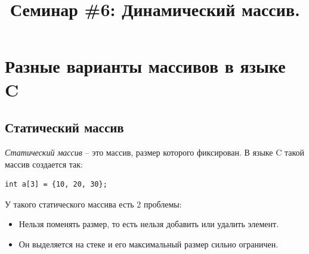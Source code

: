 \documentclass{article}
\begin{document}
\title{Семинар \#6: Динамический массив.\vspace{-5ex}}\date{}\maketitle

\section*{Разные варианты массивов в языке C}
\subsection*{Статический массив}
\begin{raggedleft}
\textit{Статический массив} -- это массив, размер которого фиксирован. В языке C такой массив создается так:
\end{raggedleft}
\begin{lstlisting}
int a[3] = {10, 20, 30};
\end{lstlisting}
У такого статического массива есть 2 проблемы:
\begin{itemize}
\item Нельзя поменять размер, то есть нельзя добавить или удалить элемент.
\item Он выделяется на стеке и его максимальный размер сильно ограничен.
\end{itemize}
\end{document}
